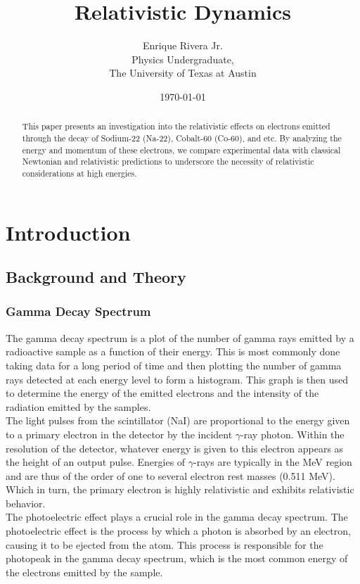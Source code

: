 \documentclass[12pt]{article}
\title{Relativistic Dynamics}
\author{Enrique Rivera Jr. \\
        Physics Undergraduate, \\ 
        The University of Texas at Austin}
\date{\today}
\begin{document}
\maketitle

\begin{abstract}
        This paper presents an investigation into the relativistic effects on electrons emitted through 
        the decay of Sodium-22 (Na-22), Cobalt-60 (Co-60), and etc. By analyzing the energy and momentum of these electrons, 
        we compare experimental data with classical Newtonian and relativistic predictions to underscore 
        the necessity of relativistic considerations at high energies.
\end{abstract}

\section{Introduction}
    \subsection{Background and Theory}

        \subsubsection{Gamma Decay Spectrum} 
        The gamma decay spectrum is a plot of the number of gamma rays emitted by a radioactive sample as a function of their energy.
        This is most commonly done taking data for a long period of time and then plotting the number of gamma rays detected at each energy level to form a histogram.
        This graph is then used to determine the energy of the emitted electrons and the intensity of the radiation emitted by the samples.
        \\
        
       The light pulses from the scintillator (NaI) are proportional to the 
        energy given to a primary electron in the detector by the incident $\gamma$-ray photon. Within the resolution of the detector, 
        whatever energy is given to this electron appears as the height of an output pulse. Energies of $\gamma$-rays are typically in 
        the MeV region and are thus of the order of one to several electron rest masses (0.511 MeV). Which in turn, the primary electron 
        is highly relativistic and exhibits relativistic behavior.
        \\ 

        The photoelectric effect plays a crucial role in the gamma decay spectrum. The photoelectric effect is the process by 
        which a photon is absorbed by an electron, causing it to be ejected from the atom. This process is responsible for the
        photopeak in the gamma decay spectrum, which is the most common energy of the electrons emitted by the sample. 
        \\
\end{document}
